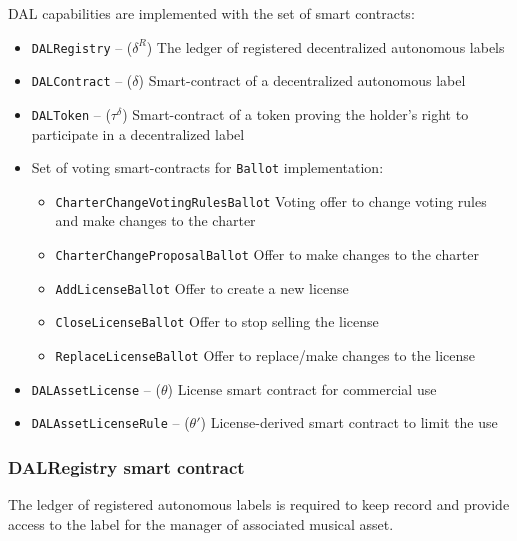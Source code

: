 \documentclass[12pt]{report}
\newcommand{\hlc}[1]{\colorbox{white!25}{#1}}
\def\code#1{\colorbox{light-gray}{\texttt{#1}}}
\begin{document}
DAL capabilities are implemented with the set of smart contracts:
\begin{itemize}
	\item\code{DALRegistry} – ($\delta^R$)\hfill\null\linebreak
	The ledger of registered decentralized autonomous labels
	\item\code{DALContract} – ($\delta$)\hfill\null\linebreak
	Smart-contract of a decentralized autonomous label
	\item\code{DALToken} – ($\tau^\delta$)\hfill\null\linebreak
	Smart-contract of a token proving the holder's right to participate in a decentralized label
	\item \hlc{Set of voting smart-contracts} for \code{Ballot} implementation:
	\begin{itemize}
		\item\code{CharterChangeVotingRulesBallot}
		Voting offer to change voting rules and make changes to the charter
		\item\code{CharterChangeProposalBallot}\hfill\null\linebreak
		Offer to make changes to the charter
		\item\code{AddLicenseBallot}\hfill\null\linebreak
		Offer to create a new license
		\item\code{CloseLicenseBallot}\hfill\null\linebreak
		Offer to stop selling the license
		\item\code{ReplaceLicenseBallot}\hfill\null\linebreak
		Offer to replace/make changes to the license
	\end{itemize}
\item\code{DALAssetLicense} – ($\theta$)\hfill\null\linebreak
License smart contract for commercial use
\item\code{DALAssetLicenseRule} – ($\theta'$)\hfill\null\linebreak
License-derived smart contract to limit the use 
\end{itemize}
\subsubsection{DALRegistry smart contract}
\label{tech-apps-dal-registry}
The ledger of registered autonomous labels is required to keep record and provide access to the label for the manager of associated musical asset.
\end{document}
